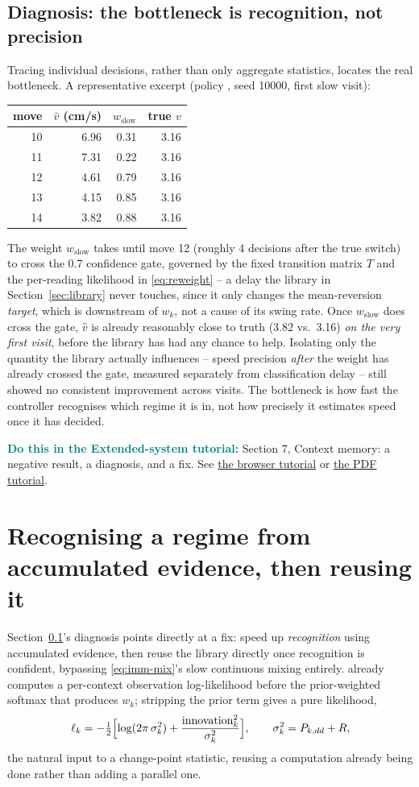\documentclass[11pt,a4paper]{article}
\newcommand{\code}[1]{\texttt{\detokenize{#1}}}
\newcommand{\tutoext}[2]{\par\textcolor{teal}{\textbf{Do this in the Extended-system tutorial:}} Section #1, #2. See \href{Tutorial_EXT1_EN.html}{the browser tutorial} or \href{Tutorial_EXT1_EN.pdf}{the PDF tutorial}.\par}
\begin{document}
\subsection{Diagnosis: the bottleneck is recognition, not precision}
\label{sec:diagnosis}
Tracing individual decisions, rather than only aggregate statistics, locates the real
bottleneck. A representative excerpt (policy \code{ext1}, seed 10000, first slow
visit):
\begin{center}\small
\begin{tabular}{rrrr}\toprule
move & $\widehat v$ (cm/s) & $w_{\text{slow}}$ & true $v$\\\midrule
10 & 6.96 & 0.31 & 3.16\\
11 & 7.31 & 0.22 & 3.16\\
12 & 4.61 & 0.79 & 3.16\\
13 & 4.15 & 0.85 & 3.16\\
14 & 3.82 & 0.88 & 3.16\\
\bottomrule
\end{tabular}\end{center}
The weight $w_{\text{slow}}$ takes until move 12 (roughly 4 decisions after the true
switch) to cross the 0.7 confidence gate, governed by the fixed transition matrix $T$
and the per-reading likelihood in \eqref{eq:reweight} -- a delay the library in
Section~\ref{sec:library} never touches, since it only changes the mean-reversion
\emph{target}, which is downstream of $w_k$, not a cause of its swing rate. Once
$w_{\text{slow}}$ does cross the gate, $\widehat v$ is already reasonably close to
truth (3.82 vs.\ 3.16) \emph{on the very first visit}, before the library has had any
chance to help. Isolating only the quantity the library actually influences -- speed
precision \emph{after} the weight has already crossed the gate, measured separately
from classification delay -- still showed no consistent improvement across visits.
The bottleneck is how fast the controller recognises which regime it is in, not how
precisely it estimates speed once it has decided.
\tutoext{7}{Context memory: a negative result, a diagnosis, and a fix}

\section{Recognising a regime from accumulated evidence, then reusing it}
\label{sec:cusum}
Section~\ref{sec:diagnosis}'s diagnosis points directly at a fix: speed up
\emph{recognition} using accumulated evidence, then reuse the library directly once
recognition is confident, bypassing \eqref{eq:imm-mix}'s slow continuous mixing
entirely. \code{Belief.observe} already computes a per-context observation
log-likelihood before the prior-weighted softmax that produces $w_k$; stripping the
prior term gives a pure likelihood,
\begin{equation}\label{eq:raw-ll}
\ell_k=-\tfrac12\Bigl[\log(2\pi\,\sigma_k^2)+\frac{\text{innovation}_k^2}{\sigma_k^2}\Bigr],
\qquad \sigma_k^2=P_{k,dd}+R,
\end{equation}
the natural input to a change-point statistic, reusing a computation already being
done rather than adding a parallel one.
\end{document}
